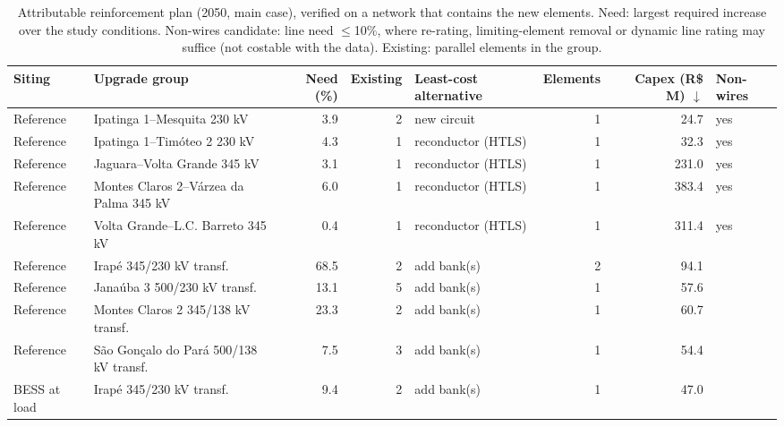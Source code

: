 \begin{table}[!htbp]
\centering
\footnotesize
\caption{Attributable reinforcement plan (2050, main case), verified on a network that contains the new elements. Need: largest required increase over the study conditions. Non-wires candidate: line need $\le$10\%, where re-rating, limiting-element removal or dynamic line rating may suffice (not costable with the data). Existing: parallel elements in the group.}
\label{tab:plan}
\begin{adjustbox}{max width=\linewidth}
\begin{tabular}{llrrlrrl}
\toprule
Siting & Upgrade group & Need (\%) & Existing & Least-cost alternative & Elements & Capex (R\$ M) $\downarrow$ & Non-wires \\
\midrule
Reference & Ipatinga 1–Mesquita 230 kV & 3.9 & 2 & new circuit & 1 & 24.7 & yes \\
Reference & Ipatinga 1–Timóteo 2 230 kV & 4.3 & 1 & reconductor (HTLS) & 1 & 32.3 & yes \\
Reference & Jaguara–Volta Grande 345 kV & 3.1 & 1 & reconductor (HTLS) & 1 & 231.0 & yes \\
Reference & Montes Claros 2–Várzea da Palma 345 kV & 6.0 & 1 & reconductor (HTLS) & 1 & 383.4 & yes \\
Reference & Volta Grande–L.C. Barreto 345 kV & 0.4 & 1 & reconductor (HTLS) & 1 & 311.4 & yes \\
Reference & Irapé 345/230 kV transf. & 68.5 & 2 & add bank(s) & 2 & 94.1 &  \\
Reference & Janaúba 3 500/230 kV transf. & 13.1 & 5 & add bank(s) & 1 & 57.6 &  \\
Reference & Montes Claros 2 345/138 kV transf. & 23.3 & 2 & add bank(s) & 1 & 60.7 &  \\
Reference & São Gonçalo do Pará 500/138 kV transf. & 7.5 & 3 & add bank(s) & 1 & 54.4 &  \\
BESS at load & Irapé 345/230 kV transf. & 9.4 & 2 & add bank(s) & 1 & 47.0 &  \\
\bottomrule
\end{tabular}
\end{adjustbox}
\end{table}
